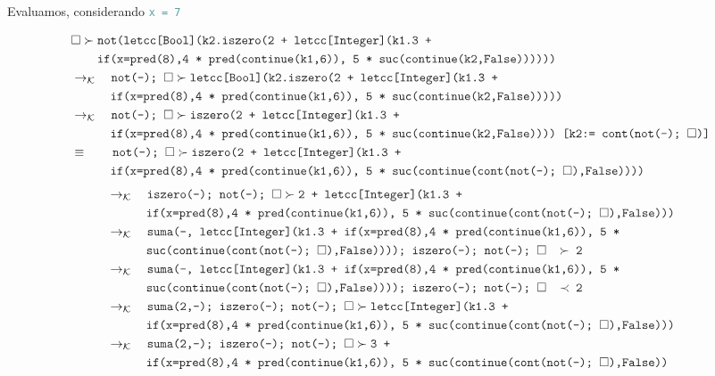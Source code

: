 \documentclass{article}
\newcommand{\tx}[1]{\textcolor{Black} {\texttt{#1}}}
\newcommand{\tp}[1]{\textcolor{CadetBlue} {\texttt{#1}}}
\newcommand{\es}{$\square$}
\newcommand{\pop}[2]{ \tx{#1} \succ \tx{#2}}
\newcommand{\kr}{\rightarrow_{\mathcal{K}} \quad}
\begin{document}
\begin{enumerate}
\begin{enumerate}
     		Evaluamos, considerando \tp{x = 7}

			\begin{align*}
			&\pop{\es}{not(letcc[Bool](k2.iszero(2 + letcc[Integer](k1.3 +} \\
			&\tx{\quad \quad  if(x=pred(8),4 * pred(continue(k1,6)), 5 * suc(continue(k2,False))))))}\\
			&\kr \pop{not(-); \es}{letcc[Bool](k2.iszero(2 + letcc[Integer](k1.3 +} \\
			&\tx{\quad \quad \quad if(x=pred(8),4 * pred(continue(k1,6)), 5 * suc(continue(k2,False)))))}\\
			&\kr \pop{not(-); \es}{iszero(2 + letcc[Integer](k1.3 +} \\
			&\tx{\quad \quad \quad if(x=pred(8),4 * pred(continue(k1,6)), 5 * suc(continue(k2,False)))) [k2:= cont(not(-); \es)]}\\
			&\equiv \quad \quad \pop{not(-); \es}{iszero(2 + letcc[Integer](k1.3 +} \\
			&\tx{\quad \quad \quad if(x=pred(8),4 * pred(continue(k1,6)), 5 * suc(continue(cont(not(-); \es),False))))}\\		
			\end{align*}
			\begin{align*}			
			&\kr \pop{iszero(-); not(-); \es}{2 + letcc[Integer](k1.3 +} \\
			&\tx{\quad \quad \quad if(x=pred(8),4 * pred(continue(k1,6)), 5 * suc(continue(cont(not(-); \es),False)))}\\
			&\kr \tx{suma(-, letcc[Integer](k1.3 + if(x=pred(8),4 * pred(continue(k1,6)), 5 *}\\ &\tx{\quad \quad \quad suc(continue(cont(not(-); \es),False)))); iszero(-); not(-); \es $\quad \succ$ 2}\\
			&\kr \tx{suma(-, letcc[Integer](k1.3 + if(x=pred(8),4 * pred(continue(k1,6)), 5 *}\\ &\tx{\quad \quad \quad suc(continue(cont(not(-); \es),False)))); iszero(-); not(-); \es $\quad \prec$ 2}\\
			&\kr \pop{suma(2,-); iszero(-); not(-); \es}{letcc[Integer](k1.3 +}\\
			&\tx{\quad \quad \quad if(x=pred(8),4 * pred(continue(k1,6)), 5 * suc(continue(cont(not(-); \es),False)))}\\
			&\kr \pop{suma(2,-); iszero(-); not(-); \es}{3 +}\\
			&\tx{\quad \quad \quad if(x=pred(8),4 * pred(continue(k1,6)), 5 * suc(continue(cont(not(-); \es),False))}\\

\end{align*}
\end{enumerate}
\end{enumerate}
\end{document}
